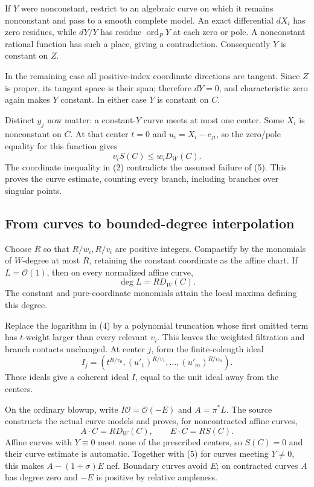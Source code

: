 If \(Y\) were nonconstant, restrict to an algebraic curve on which it remains nonconstant and pass to a smooth complete model. An exact differential \(dX_i\) has zero residues, while \(dY/Y\) has residue \(\operatorname{ord}_P Y\) at each zero or pole. A nonconstant rational function has such a place, giving a contradiction. Consequently \(Y\) is constant on \(Z\).

In the remaining case all positive-index coordinate directions are tangent. Since \(Z\) is proper, its tangent space is their span; therefore \(dY=0\), and characteristic zero again makes \(Y\) constant. In either case \(Y\) is constant on \(C\).

Distinct \(y_j\) now matter: a constant-\(Y\) curve meets at most one center. Some \(X_i\) is nonconstant on \(C\). At that center \(t=0\) and \(u_i=X_i-c_{ji}\), so the zero/pole equality for this function gives
\[
v_iS(C)\le w_iD_W(C).
\]
The coordinate inequality in (2) contradicts the assumed failure of (5). This proves the curve estimate, counting every branch, including branches over singular points.

\subsection{From curves to bounded-degree interpolation}

Choose \(R\) so that \(R/w_i,R/v_i\) are positive integers. Compactify by the monomials of \(W\)-degree at most \(R\), retaining the constant coordinate as the affine chart. If \(L=\mathcal O(1)\), then on every normalized affine curve,
\[
\deg L=R D_W(C).
\]
The constant and pure-coordinate monomials attain the local maxima defining this degree.

Replace the logarithm in (4) by a polynomial truncation whose first omitted term has \(t\)-weight larger than every relevant \(v_i\). This leaves the weighted filtration and branch contacts unchanged. At center \(j\), form the finite-colength ideal
\[
I_j=(t^{R/v_0},(u'_1)^{R/v_1},\ldots,(u'_m)^{R/v_m}).
\]
These ideals give a coherent ideal \(I\), equal to the unit ideal away from the centers.

On the ordinary blowup, write \(I\mathcal O=\mathcal O(-E)\) and \(A=\pi^*L\). The source constructs the actual curve models and proves, for noncontracted affine curves,
\[
A\cdot C=RD_W(C),\qquad E\cdot C=RS(C).
\]
Affine curves with \(Y\equiv0\) meet none of the prescribed centers, so \(S(C)=0\) and their curve estimate is automatic. Together with (5) for curves meeting \(Y\ne0\), this makes \(A-(1+\sigma)E\) nef. Boundary curves avoid \(E\); on contracted curves \(A\) has degree zero and \(-E\) is positive by relative ampleness.

